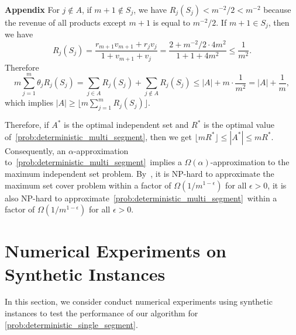 \documentclass[msom,non-blindrev]{informs3} %
\theoremstyle{definition}
\begin{document}
\begin{appendices}{\Large \noindent\textbf{Appendix}}
For $j\notin A$, if $m+1\notin S_j$, we have $R_j(S_j)<m^{-2}/2<m^{-2}$ because  the revenue of all products except $m+1$ is equal to $m^{-2}/2$.  If $m+1\in S_j$, then we have
\begin{equation*}
R_j(S_j)=\dfrac{r_{m+1}v_{m+1}+r_jv_j}{1+v_{m+1}+v_j}=\dfrac{2+m^{-2}/2\cdot 4m^2}{1+1+4m^2}\leq \dfrac{1}{m^2}.
\end{equation*}
Therefore
\begin{equation*}
	m\sum_{j=1}^m \theta_jR_j(S_j)=\sum_{j\in A}R_j(S_j)+\sum_{j\notin A}R_j(S_j)\leq|A|+m\cdot\dfrac{1}{m^2}=|A|+\dfrac{1}{m},
\end{equation*}
which implies $|A|\geq \lfloor m\sum_{j=1}^m R_j(S_j)\rfloor$.
		
Therefore, if $A^*$ is the optimal independent set and $R^*$ is the optimal value of~\eqref{prob:deterministic_multi_segment}, then we get $\lfloor mR^*\rfloor\leq |A^*|\leq mR^*$. Consequently, an $\alpha$-approximation to~\eqref{prob:deterministic_multi_segment}~implies a $\Omega(\alpha)$-approximation to the maximum independent set problem.
By~\cite{feige1996interactive}, it is NP-hard to approximate the maximum set cover problem within a factor of $\Omega(1/m^{1-\epsilon})$ for all $\epsilon>0$, it is also NP-hard to approximate~\eqref{prob:deterministic_multi_segment}~within a factor of $\Omega(1/m^{1-\epsilon})$ for all $\epsilon>0$.

{ 

\section{Numerical Experiments on Synthetic Instances}\label{sec:numerical_synthetic}

In this section, we consider conduct numerical experiments using synthetic instances to test the performance of our algorithm for \eqref{prob:deterministic_single_segment}.

}
\end{appendices}
\end{document}
